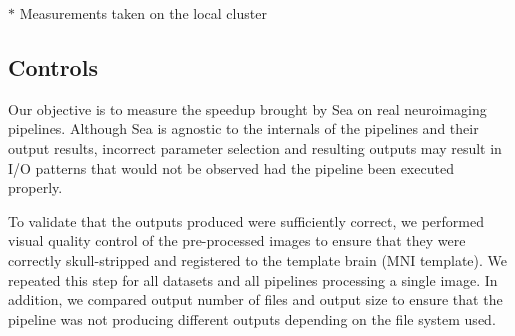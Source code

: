     \begin{table}[t]
      \small\centering
    \footnotesize{$*$ Measurements taken on the local cluster}
    \caption{Pipeline execution characteristics}\label{table:seaneuro:pipelines}
    \end{table}

    \subsection{Controls}
    Our objective is to measure the speedup brought by Sea on real neuroimaging
    pipelines. Although Sea is agnostic to the internals of the pipelines and
    their output results, incorrect parameter selection and resulting outputs
    may result in I/O patterns that would not be observed had the pipeline been
    executed properly.
   
    To validate that the outputs produced were sufficiently correct, we
    performed visual quality control of the pre-processed images to ensure
    that they were correctly skull-stripped and registered to the template
    brain (MNI template). We repeated this step for all datasets and all
    pipelines processing a single image. In addition, we compared output
    number of files and output size to ensure that the pipeline was not
    producing different outputs depending on the file system used.
    
